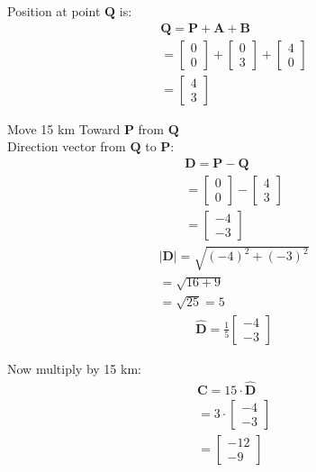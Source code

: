 \documentclass[journal]{IEEEtran}
\begin{document}
Position at point  $\mathbf{Q}$ is:
\begin{align}
\mathbf{Q} = \mathbf{P} + \mathbf{A} + \mathbf{B} \\= \begin{bmatrix} 0 \\ 0 \end{bmatrix} + \begin{bmatrix} 0 \\ 3 \end{bmatrix} + \begin{bmatrix} 4 \\ 0 \end{bmatrix} \\= \begin{bmatrix} 4 \\ 3 \end{bmatrix}
\end{align}

Move 15 km Toward $\mathbf{P}$ from $\mathbf{Q}$\\
Direction vector from $\mathbf{Q}$ to $\mathbf{P}$:
\begin{align}
\mathbf{D} = \mathbf{P} - \mathbf{Q}\\
= \begin{bmatrix} 0 \\ 0 \end{bmatrix} - \begin{bmatrix} 4 \\ 3 \end{bmatrix} \\
= \begin{bmatrix} -4 \\ -3 \end{bmatrix}
\end{align}
\begin{align}
|\mathbf{D}| = \sqrt{(-4)^2 + (-3)^2}\\
= \sqrt{16 + 9} \\
= \sqrt{25} = 5
\end{align}
\begin{align}
\hat{\mathbf{D}} = \frac{1}{5} \begin{bmatrix} -4 \\ -3 \end{bmatrix}
\end{align}

Now multiply by 15 km:
\begin{align}
\mathbf{C} = 15 \cdot \hat{\mathbf{D}}\\ = 3 \cdot \begin{bmatrix} -4 \\ -3 \end{bmatrix} \\
= \begin{bmatrix} -12 \\ -9 \end{bmatrix}
\end{align}
\end{document}
